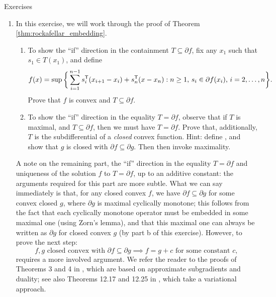 \begin{xcb}{Exercises}
\begin{enumerate}[label=\thechapter.\arabic*]
\item \label{ex:rockafellar_embedding}
  In this exercise, we will work through the proof of Theorem
  \ref{thm:rockafellar_embedding}. 

\begin{enumerate}[label=\alph*.]
\item To show the ``if'' direction in the containment $T \subseteq \partial f$,
  fix any $x_1$ such that $s_1 \in T(x_1)$, and define 
  \[
  f(x) = \sup\bigg\{ \sum_{i=1}^{n-1} s_i^{\mathsf{T}} (x_{i+1} - x_i) + s_n^{\mathsf{T}} (x - x_n)
  : \text{$n \geq 1$, $s_i \in \partial f(x_i)$, $i=2,\ldots,n$} \bigg\}.
  \]
  Prove that $f$ is convex and $T \subseteq \partial f$.

\item To show the ``if'' direction in the equality $T = \partial f$, observe
  that if $T$ is maximal, and $T \subseteq \partial f$, then we must have $T =
  \partial f$. Prove that, additionally, $T$ is the subdifferential of a
  \emph{closed} convex function. Hint: define , and show that $g$ is closed with $\partial f \subseteq \partial
  g$. Then then invoke maximality.   
\end{enumerate}

\smallskip
A note on the remaining part, the ``if'' direction in the equality $T = \partial
f$ and uniqueness of the solution $f$ to $T = \partial f$, up to an additive 
constant: the arguments required for this part are more subtle. What we can say  
immediately is that, for any closed convex $f$, we have $\partial f \subseteq
\partial g$ for some convex closed $g$, where $\partial g$ is maximal cyclically
monotone; this follows from the fact that each cyclically monotone operator must
be embedded in some maximal one (using Zorn's lemma), and that this maximal one
can always be written as $\partial g$ for closed convex $g$ (by part b of this
exercise). However, to prove the next step: 
\begin{equation} 
\label{eq:embedding_equality}
\text{$f,g$ closed convex with $\partial f \subseteq \partial g$} \implies 
\text{$f = g + c$ for some constant $c$},
\end{equation} 
requires a more involved argument. We refer the reader to the proofs of Theorems
3 and 4 in \cite{rockafellar1966characterization}, which are based on
approximate subgradients and duality; see also Theorems 12.17 and 12.25 in   
\cite{rockafellar2009variational}, which take a variational approach.      


\end{enumerate}
\end{xcb}
